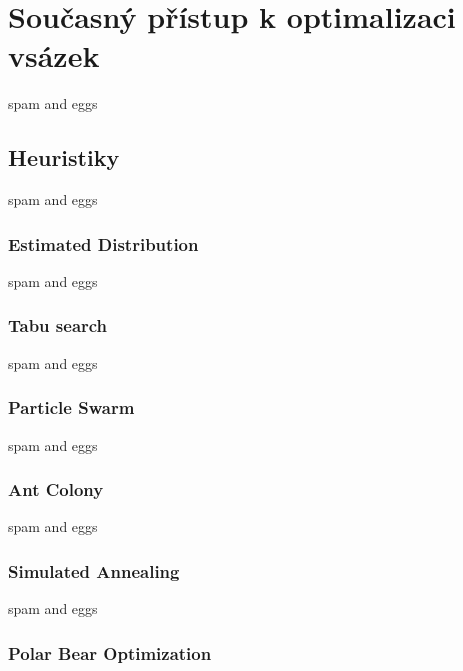 \chapter{Současný přístup k optimalizaci vsázek}
\label{ch:soucasnost}
spam and eggs



\section{Heuristiky}
spam and eggs

\subsection{Estimated Distribution}
spam and eggs

\subsection{Tabu search}
spam and eggs

\subsection{Particle Swarm}
spam and eggs
\subsection{Ant Colony}
spam and eggs

\subsection{Simulated Annealing}
spam and eggs
\subsection{Polar Bear Optimization}
